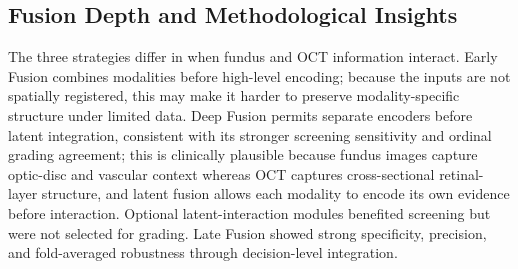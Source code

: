 \documentclass{ieeeaccess}
\begin{document}
\begin{table}[!t]
    \centering
    \caption{Summary of the official test-set results for binary glaucoma screening and multiclass glaucoma grading.}
    \label{tab:summary_results}
\end{table}

\subsection{Fusion Depth and Methodological Insights}
\label{subsec:fusion_depth_discussion}

The three strategies differ in when fundus and OCT information interact. Early Fusion combines modalities before high-level encoding; because the inputs are not spatially registered, this may make it harder to preserve modality-specific structure under limited data. Deep Fusion permits separate encoders before latent integration, consistent with its stronger screening sensitivity and ordinal grading agreement; this is clinically plausible because fundus images capture optic-disc and vascular context whereas OCT captures cross-sectional retinal-layer structure, and latent fusion allows each modality to encode its own evidence before interaction. Optional latent-interaction modules benefited screening but were not selected for grading. Late Fusion showed strong specificity, precision, and fold-averaged robustness through decision-level integration.
\end{document}
